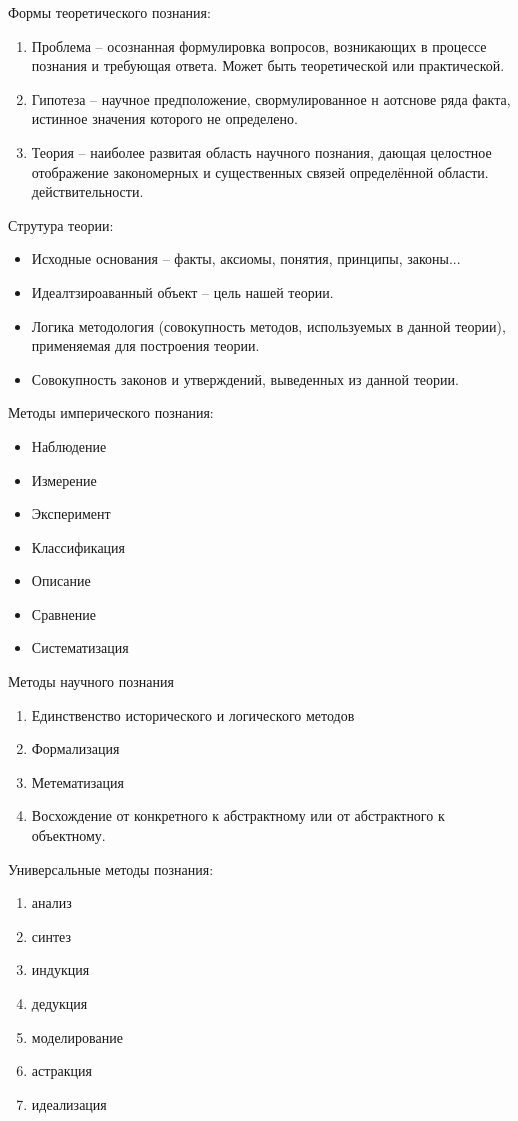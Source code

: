 \documentclass[12pt,a4paper]{book}
\begin{document}
Формы теоретического познания:
\begin{enumerate}
	\item Проблема -- осознанная формулировка вопросов, возникающих в процессе познания и требующая ответа. Может быть теоретической или практической.
	\item Гипотеза -- научное предположение, свормулированное н аотснове ряда факта, истинное значения которого не определено.  
	\item Теория -- наиболее развитая область научного познания, дающая целостное отображение закономерных и существенных связей определённой области. действительности.
\end{enumerate}
Струтура теории:
\begin{itemize}
	\item Исходные основания -- факты, аксиомы, понятия, принципы, законы...
	\item Идеалтзироаванный объект -- цель нашей теории.
	\item Логика методология (совокупность методов, используемых в данной теории), применяемая для построения теории.
	\item Совокупность законов и утверждений, выведенных из данной теории.
\end{itemize}

Методы имперического познания:
\begin{itemize}
	\item Наблюдение
	\item Измерение
	\item Эксперимент
	\item Классификация
	\item Описание
	\item Сравнение
	\item Систематизация
\end{itemize}

Методы научного познания
\begin{enumerate}
	\item Единственство исторического и логического методов
	\item Формализация 
	\item Метематизация
	\item Восхождение от конкретного к абстрактному или от абстрактного к объектному.
\end{enumerate}
Универсальные методы познания:
\begin{enumerate}
\item анализ
\item синтез
\item индукция
\item дедукция
\item моделирование
\item астракция
\item идеализация
\end{enumerate}
\end{document}
